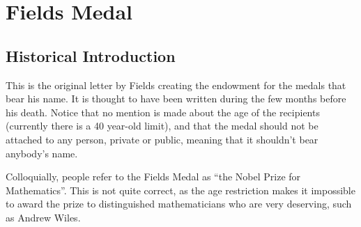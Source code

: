 \section{Fields Medal}

\subsection{Historical Introduction}

This is the original letter by Fields creating the endowment for the
medals that bear his name.  It is thought to have been written during
the few months before his death.  Notice that no mention is made about
the age of the recipients (currently there is a 40 year-old limit), and
that the medal should not be attached to any person, private or public,
meaning that it shouldn't bear anybody's name.

Colloquially, people refer to the Fields Medal as ``the Nobel Prize for
Mathematics''. This is not quite correct, as the age restriction makes
it impossible to award the prize to distinguished mathematicians who are
very deserving, such as Andrew Wiles.

